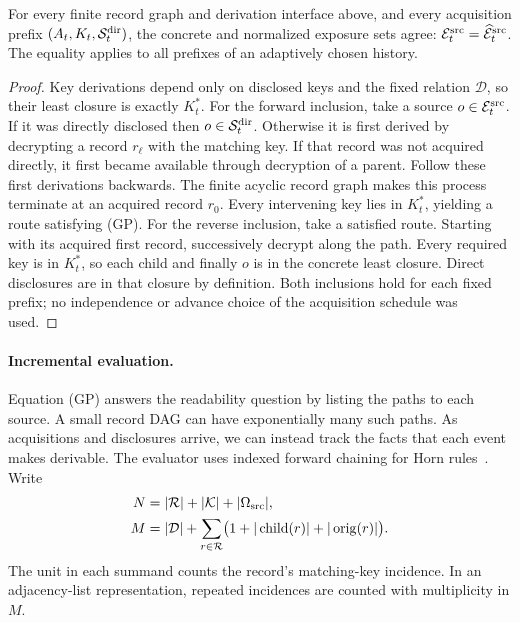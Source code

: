 \begin{theorem}
\label{thm:guarded-normalization}
For every finite record graph and derivation interface above, and every
acquisition prefix $(A_t,K_t,\mathcal S^{\rm dir}_t)$, the concrete and normalized exposure
sets agree: $\mathcal E^{\rm src}_t=\widehat{\mathcal E}^{\rm src}_t$.  The equality applies to all prefixes of
an adaptively chosen history.
\end{theorem}
\begin{proof}
Key derivations depend only on disclosed keys and the fixed relation
$\mathcal D$, so their least closure is exactly $K_t^*$.
For the forward inclusion, take a source $o\in \mathcal E^{\rm src}_t$.
If it was directly disclosed then $o\in \mathcal S^{\rm dir}_t$.
Otherwise it is first derived by decrypting a record $r_\ell$ with the
matching key. If that record was not acquired directly, it first became
available through decryption of a parent. Follow these first
derivations backwards.  The finite acyclic record graph makes this
process terminate at an acquired record $r_0$.  Every intervening key
lies in $K_t^*$, yielding a route satisfying (GP).
For the reverse inclusion, take a satisfied route.  Starting with its
acquired first record, successively decrypt along the path.  Every
required key is in $K_t^*$, so each child and finally $o$ is in the
concrete least closure.  Direct disclosures are in that closure by
definition.  Both inclusions hold for each fixed prefix; no independence
or advance choice of the acquisition schedule was used.
\end{proof}

\paragraph{Incremental evaluation.}
Equation (GP) answers the readability question by listing the paths to
each source. A small record DAG can have exponentially many such paths.
As acquisitions and disclosures arrive, we can instead track the facts
that each event makes derivable. The evaluator uses indexed forward
chaining for Horn rules~\cite[Section~4]{dowlingGallier1984}.
Write
\[
\begin{aligned}
 N&=|\mathcal R|+|\mathcal K|+|\Omega_{\rm src}|,\\
 M&=|\mathcal D|+\sum_{r\in\mathcal R}
       \bigl(1+|\operatorname{child}(r)|+|\operatorname{orig}(r)|\bigr).
\end{aligned}
\]
The unit in each summand counts the record's matching-key incidence.
In an adjacency-list representation, repeated incidences are counted with
multiplicity in $M$.

